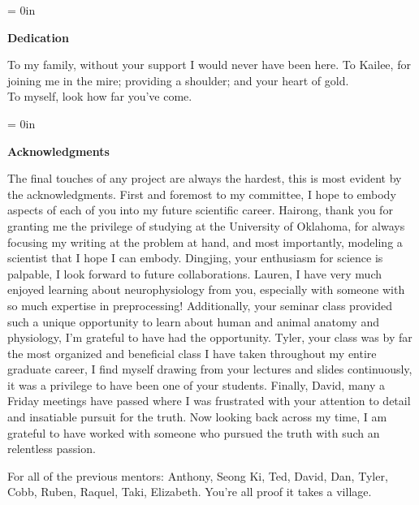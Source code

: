 \documentclass[12pt]{./styles/outhesis}
\begin{document}
\newpage
\doublespace
\headsep = 0in
\setcounter{page}{4}
\begin{center}
{\large \bf Dedication}
\end{center}

\begin{center}
To my family, without your support I would never have been here.
\newline
\newline
To Kailee, for joining me in the mire; providing a shoulder; and your heart of gold.\\
\vspace{0.25in}
To myself, look how far you've come.     
\end{center}

\newpage
\doublespace
\headsep = 0in
\setcounter{page}{5}
\begin{center}
{\large \bf Acknowledgments}
\end{center}

The final touches of any project are always the hardest, this is most evident by the acknowledgments. First and foremost to my committee, I hope to embody aspects of each of you into my future scientific career. Hairong, thank you for granting me the privilege of studying at the University of Oklahoma, for always focusing my writing at the problem at hand, and most importantly, modeling a scientist that I hope I can embody. Dingjing, your enthusiasm for science is palpable, I look forward to future collaborations. Lauren, I have very much enjoyed learning about neurophysiology from you, especially with someone with so much expertise in preprocessing! Additionally, your seminar class provided such a unique opportunity to learn about human and animal anatomy and physiology, I'm grateful to have had the opportunity. Tyler, your class was by far the most organized and beneficial class I have taken throughout my entire graduate career, I find myself drawing from your lectures and slides continuously, it was a privilege to have been one of your students. Finally, David, many a Friday meetings have passed where I was frustrated with your attention to detail and insatiable pursuit for the truth. Now looking back across my time, I am grateful to have worked with someone who pursued the truth with such an relentless passion.

For all of the previous mentors: Anthony, Seong Ki, Ted, David, Dan, Tyler, Cobb, Ruben, Raquel, Taki, Elizabeth. You're all proof it takes a village.
\end{document}
